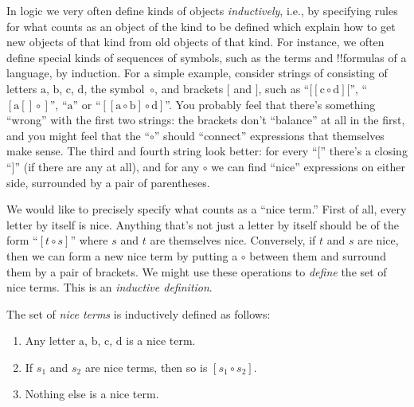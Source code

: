 \documentclass[../../../include/open-logic-section]{subfiles}
\begin{document}


In logic we very often define kinds of objects \emph{inductively},
i.e., by specifying rules for what counts as an object of the kind to
be defined which explain how to get new objects of that kind from old
objects of that kind.  For instance, we often define special kinds of
sequences of symbols, such as the terms and !!{formula}s of a
language, by induction.  For a simple example, consider strings of
consisting of letters $\mathrm{a}$, $\mathrm{b}$, $\mathrm{c}$,
$\mathrm{d}$, the symbol~$\circ$, and brackets $[$ and $]$, such as
``$[[\mathrm{c} \circ \mathrm{d}][$'', ``$[\mathrm{a}[]\circ]$'',
``$\mathrm{a}$'' or ``$[[\mathrm{a} \circ \mathrm{b}]\circ
\mathrm{d}]$''.  You probably feel that there's something
``wrong'' with the first two strings: the brackets don't
``balance'' at all in the first, and you might feel that the
``$\circ$'' should ``connect'' expressions that themselves make
sense. The third and fourth string look better: for every ``$[$''
there's a closing ``$]$'' (if there are any at all), and for any
$\circ$ we can find ``nice'' expressions on either side,
surrounded by a pair of parentheses.

We would like to precisely specify what counts as a ``nice term.''
First of all, every letter by itself is nice.  Anything that's not
just a letter by itself should be of the form ``$[t \circ s]$'' where
$s$ and $t$ are themselves nice. Conversely, if $t$ and $s$ are nice,
then we can form a new nice term by putting a $\circ$ between them and
surround them by a pair of brackets.  We might use these operations
to \emph{define} the set of nice terms.  This is an \emph{inductive
  definition}.

\begin{defn}
  The set of \emph{nice terms} is inductively defined as follows:
  \begin{enumerate}
  \item Any letter $\mathrm{a}$, $\mathrm{b}$, $\mathrm{c}$,
    $\mathrm{d}$ is a nice term.
  \item If $s_1$ and $s_2$ are nice terms, then so
    is $[s_1 \circ s_2]$.
  \item Nothing else is a nice term.
  \end{enumerate}
\end{defn}
\end{document}
